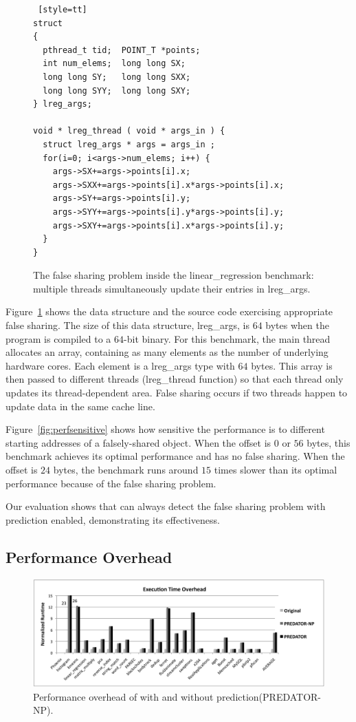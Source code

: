 \begin{figure}
\begin{lstlisting} [style=tt]
struct
{
  pthread_t tid;  POINT_T *points;
  int num_elems;  long long SX;
  long long SY;   long long SXX;
  long long SYY;  long long SXY;
} lreg_args;

void * lreg_thread ( void * args_in ) {
  struct lreg_args * args = args_in ;
  for(i=0; i<args->num_elems; i++) {
    args->SX+=args->points[i].x;
    args->SXX+=args->points[i].x*args->points[i].x;
    args->SY+=args->points[i].y;
    args->SYY+=args->points[i].y*args->points[i].y;
    args->SXY+=args->points[i].x*args->points[i].y;
  }
}
\end{lstlisting}
\caption{The false sharing problem inside the linear\_regression benchmark: multiple threads simultaneously update their entries in lreg\_args.
\label{fig:linearregression}}
\end{figure}

Figure~\ref{fig:linearregression} shows the data structure and the source code exercising appropriate false sharing. The size of this data structure, lreg\_args, is $64$ bytes 
when the program is compiled to a $64$-bit binary. For this benchmark, the main thread allocates an array, containing as many elements as the number of underlying hardware cores. Each element is a lreg\_args type with $64$ bytes. This array is then passed to different threads (lreg\_thread function) so that each thread only updates its thread-dependent area. False sharing occurs if two threads happen to update data in the same cache line. 

Figure~\ref{fig:perfsensitive} shows how sensitive the performance is to different starting addresses of a falsely-shared object. When the offset is $0$ or $56$ bytes, this benchmark achieves its optimal performance and has no false sharing. When the offset is $24$ bytes, the benchmark runs around $15$ times slower than its optimal performance because of the false sharing problem.

Our evaluation shows that \Predator{} can always detect the false sharing problem with prediction enabled, demonstrating its effectiveness.

\subsection{Performance Overhead}
\label{sec:perfoverhead}

\begin{figure}[!t]
\centering
\includegraphics[width=6in]{predator/figure/perf}
\caption{
Performance overhead of \Predator{} with and without prediction(PREDATOR-NP).
\label{fig:perf}}
\end{figure}

